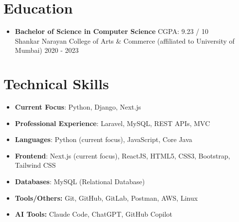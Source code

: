 \documentclass[a4paper,11pt]{article}
\begin{document}
\section{\textbf{Education}}
\begin{itemize}[leftmargin=0.13in]
    \item \textbf { Bachelor of Science in Computer Science } \hfill{CGPA: 9.23 / 10}\\
    Shankar Narayan College of Arts \& Commerce (affiliated to University of Mumbai) \hfill{2020 - 2023}
    
\end{itemize}

\section{\textbf{Technical Skills}}
 \begin{itemize}[leftmargin=0.13in]
     \item \textbf{Current Focus}{: Python, Django, Next.js}
     \vspace{-2mm}
     \item \textbf{Professional Experience}{: Laravel, MySQL, REST APIs, MVC}
     \vspace{-2mm}
     \item \textbf{Languages}{: Python (current focus), JavaScript, Core Java}
     \vspace{-2mm}
     \item \textbf{Frontend}{: Next.js (current focus), ReactJS, HTML5, CSS3, Bootstrap, Tailwind CSS}
     \vspace{-2mm}
     \item \textbf{Databases}{: MySQL (Relational Database)}
     \vspace{-2mm}
     \item \textbf{Tools/Others:} {Git, GitHub, GitLab, Postman, AWS, Linux}
     \vspace{-2mm}
     \item \textbf{AI Tools:} {Claude Code, ChatGPT, GitHub Copilot}
 \end{itemize}

\end{document}
